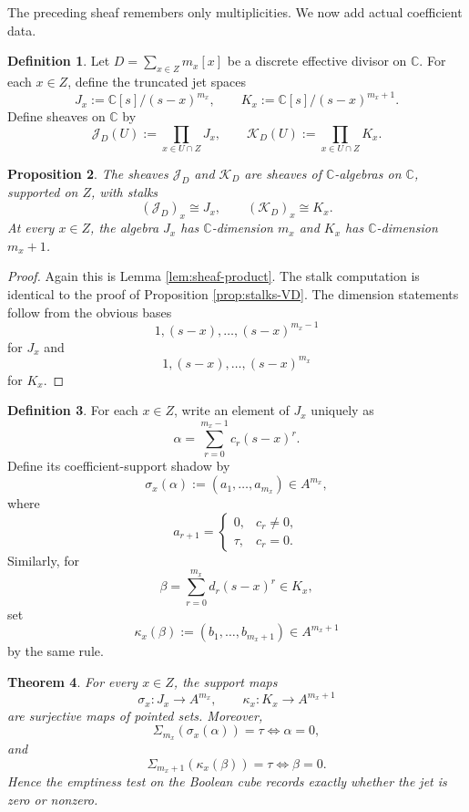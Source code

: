 \documentclass[11pt,a4paper]{article}
\newtheorem{theorem}{Theorem}[section]
\newtheorem{proposition}[theorem]{Proposition}
\theoremstyle{definition}
\newtheorem{definition}[theorem]{Definition}
\theoremstyle{remark}
\newcommand{\CC}{\mathbb C}
\newcommand{\taup}{\tau}
\begin{document}
The preceding sheaf remembers only multiplicities.  We now add actual coefficient data.

\begin{definition}
Let $D=\sum_{x\in Z}m_x[x]$ be a discrete effective divisor on $\CC$.  For each $x\in Z$, define the truncated jet spaces
\[
J_x:=\CC[s]/(s-x)^{m_x},
\qquad
K_x:=\CC[s]/(s-x)^{m_x+1}.
\]
Define sheaves on $\CC$ by
\[
\mathcal J_D(U):=\prod_{x\in U\cap Z}J_x,
\qquad
\mathcal K_D(U):=\prod_{x\in U\cap Z}K_x.
\]
\end{definition}

\begin{proposition}\label{prop:jets-sheaves}
The sheaves $\mathcal J_D$ and $\mathcal K_D$ are sheaves of $\CC$-algebras on $\CC$, supported on $Z$, with stalks
\[
(\mathcal J_D)_x\cong J_x,
\qquad
(\mathcal K_D)_x\cong K_x.
\]
At every $x\in Z$, the algebra $J_x$ has $\CC$-dimension $m_x$ and $K_x$ has $\CC$-dimension $m_x+1$.
\end{proposition}

\begin{proof}
Again this is Lemma \ref{lem:sheaf-product}.  The stalk computation is identical to the proof of Proposition \ref{prop:stalks-VD}.  The dimension statements follow from the obvious bases
\[
1,(s-x),\dots,(s-x)^{m_x-1}
\]
for $J_x$ and
\[
1,(s-x),\dots,(s-x)^{m_x}
\]
for $K_x$.
\end{proof}

\begin{definition}
For each $x\in Z$, write an element of $J_x$ uniquely as
\[
\alpha=\sum_{r=0}^{m_x-1} c_r (s-x)^r.
\]
Define its coefficient-support shadow by
\[
\sigma_x(\alpha):=(a_1,\dots,a_{m_x})\in A^{m_x},
\]
where
\[
a_{r+1}=\begin{cases}
0,& c_r\neq0,\\
\taup,& c_r=0.
\end{cases}
\]
Similarly, for
\[
\beta=\sum_{r=0}^{m_x} d_r (s-x)^r\in K_x,
\]
set
\[
\kappa_x(\beta):=(b_1,\dots,b_{m_x+1})\in A^{m_x+1}
\]
by the same rule.
\end{definition}

\begin{theorem}\label{thm:jet-shadow}
For every $x\in Z$, the support maps
\[
\sigma_x:J_x\to A^{m_x},
\qquad
\kappa_x:K_x\to A^{m_x+1}
\]
are surjective maps of pointed sets.  Moreover,
\[
\Sigma_{m_x}(\sigma_x(\alpha))=\taup
\iff \alpha=0,
\]
and
\[
\Sigma_{m_x+1}(\kappa_x(\beta))=\taup
\iff \beta=0.
\]
Hence the emptiness test on the Boolean cube records exactly whether the jet is zero or nonzero.
\end{theorem}
\end{document}
